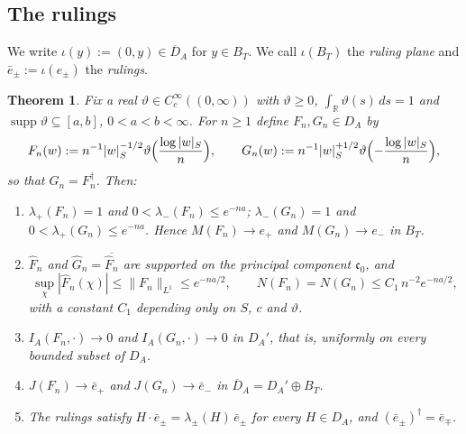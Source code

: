 \documentclass[11pt]{amsart}
\newtheorem{theorem}{Theorem}[section]
\theoremstyle{definition}
\theoremstyle{remark}
\newcommand{\R}{\mathbb R}
\newcommand{\supp}{\operatorname{supp}}
\newcommand{\DA}{D_A}
\newcommand{\BT}{B_T}
\newcommand{\NAd}{\overline{D}_A}
\begin{document}
\subsection{The rulings}

We write $\iota(y):=(0,y)\in\NAd$ for $y\in\BT$.  We call $\iota(\BT)$ the
\emph{ruling plane} and $\bar e_{\pm}:=\iota(e_{\pm})$ the \emph{rulings}.

\begin{theorem}\label{thm:rulings}
Fix a real $\vartheta\in C_c^{\infty}((0,\infty))$ with $\vartheta\ge0$,
$\int_{\R}\vartheta(s)\,ds=1$ and $\supp\vartheta\subseteq[a,b]$,
$0<a<b<\infty$.  For $n\ge1$ define $F_n,G_n\in\DA$ by
\begin{equation}\label{eq:spread}
F_n(w):=n^{-1}|w|_S^{-1/2}\vartheta\Bigl(\frac{\log|w|_S}{n}\Bigr),\qquad
G_n(w):=n^{-1}|w|_S^{+1/2}\vartheta\Bigl(-\frac{\log|w|_S}{n}\Bigr),
\end{equation}
so that $G_n=F_n^{\dagger}$.  Then:
\begin{enumerate}
\item[(a)] $\lambda_+(F_n)=1$ and $0<\lambda_-(F_n)\le e^{-na}$;
$\lambda_-(G_n)=1$ and $0<\lambda_+(G_n)\le e^{-na}$.  Hence $M(F_n)\to e_+$
and $M(G_n)\to e_-$ in $\BT$.
\item[(b)] $\widehat F_n$ and $\widehat G_n=\overline{\widehat F_n}$ are
supported on the principal component $\mathfrak c_0$, and
\begin{equation}\label{eq:supFhat}
\sup_{\chi}|\widehat F_n(\chi)|\le\lVert F_n\rVert_{L^{1}}\le e^{-na/2},\qquad
N(F_n)=N(G_n)\le C_1\,n^{-2}e^{-na/2},
\end{equation}
with a constant $C_1$ depending only on $S$, $c$ and $\vartheta$.
\item[(c)] $I_A(F_n,\cdot)\to0$ and $I_A(G_n,\cdot)\to0$ in $\DA'$, that is,
uniformly on every bounded subset of $\DA$.
\item[(d)] $J(F_n)\to\bar e_+$ and $J(G_n)\to\bar e_-$ in $\NAd=\DA'\oplus\BT$.
\item[(e)] The rulings satisfy
$H\cdot\bar e_{\pm}=\lambda_{\pm}(H)\,\bar e_{\pm}$ for every $H\in\DA$, and
$(\bar e_{\pm})^{\dagger}=\bar e_{\mp}$.
\end{enumerate}
\end{theorem}
\end{document}
